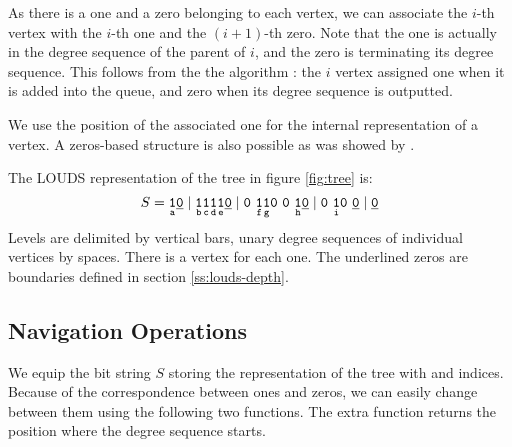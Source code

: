As there is a one and a zero belonging to each vertex, we can associate the $i$-th vertex with the $i$-th one and the $(i+1)$-th zero.
Note that the one is actually in the degree sequence of the parent of $i$, and the zero is terminating its degree sequence.
This follows from the the algorithm \LOUDSRepresentation{}: the $i$ vertex assigned one when it is added into the queue, and zero when its degree sequence is outputted.

We use the position of the associated one for the internal representation of a vertex.
A zeros-based structure is also possible as was showed by \cite{rahman2006engineering}.

\begin{example}
	The LOUDS representation of the tree in figure \ref{fig:tree} is:
	$$ S = \mathtt{\x1a \underline{0} \mid \x1b \x1c \x1d \x1e \underline{0} \mid 0 ~ \x1f \x1g 0 ~ 0 ~ \x1h \underline{0} \mid 0 ~ \x1i 0 ~ \underline{0} \mid \underline{0}} $$
	Levels are delimited by vertical bars, unary degree sequences of individual vertices by spaces.
	There is a vertex for each one.
	The underlined zeros are boundaries defined in section \ref{ss:louds-depth}.
\end{example}

\subsection{Navigation Operations}

We equip the bit string $S$ storing the representation of the tree with \rank{} and \select{} indices.
Because of the correspondence between ones and zeros, we can easily change between them using the following two functions.
The extra function \toBeginning{} returns the position where the degree sequence starts.

\begin{algorithm}
\begin{algorithmic}
	\State {}
\EndFunction
\end{algorithmic}
\end{algorithm}

\begin{algorithm}
\begin{algorithmic}
	\State {}
\EndFunction
\end{algorithmic}
\end{algorithm}

